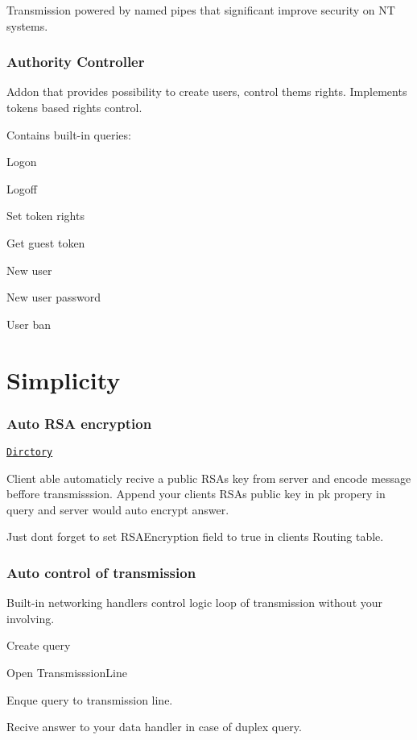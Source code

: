 Transmission powered by named pipes that significant improve security on NT systems.

\subsubsection*{Authority Controller}

Addon that provides possibility to create users, control them\textquotesingle{}s rights. Implements tokens based rights control.

Contains built-\/in queries\+:
\begin{DoxyItemize}
\item Logon
\item Logoff
\item Set token rights
\item Get guest token
\item New user
\item New user password
\item User ban
\end{DoxyItemize}

\section*{Simplicity}

\subsubsection*{Auto R\+SA encryption}

\href{./Core/PipesProvider/Security/}{\tt Dirctory}

Client able automaticly recive a public R\+SA\textquotesingle{}s key from server and encode message beffore transmisssion. Append your client\textquotesingle{}s R\+SA\textquotesingle{}s public key in {\ttfamily pk} propery in query and server would auto encrypt answer.

Just don\textquotesingle{}t forget to set R\+S\+A\+Encryption field to true in client\textquotesingle{}s {\ttfamily Routing table}.

\subsubsection*{Auto control of transmission}

Built-\/in networking handlers control logic loop of transmission without your involving.
\begin{DoxyEnumerate}
\item Create query
\item Open {\ttfamily Transmisssion\+Line}
\item Enque query to transmission line.
\item Recive answer to your data handler in case of duplex query.
\end{DoxyEnumerate}

